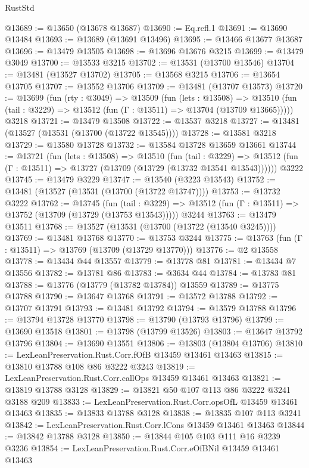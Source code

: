 \begin{lexlean}{RustStd}
\begin{coremodule}
@13689 := @13650 (@13678 @13687)
@13690 := Eq.refl.{1}
@13691 := @13690 @13484
@13693 := @13689 (@13691 @13496)
@13695 := @13466 @13677 @13687
@13696 := @13479 @13505
@13698 := @13696 @13676 @3215
@13699 := @13479 @3049
@13700 := @13533 @3215
@13702 := @13531 (@13700 @13546)
@13704 := @13481 (@13527 @13702)
@13705 := @13568 @3215
@13706 := @13654 @13705
@13707 := @13552 @13706
@13709 := @13481 (@13707 @13573)
@13720 := @13699
    (fun (rty : @3049) =>
    @13509
      (fun (lets : @13508) =>
      @13510 (fun (tail : @3229) => @13512 (fun (Γ : @13511) => @13704 (@13709 @13665)))))
    @3218
@13721 := @13479 @13508
@13722 := @13537 @3218
@13727 := @13481 (@13527 (@13531 (@13700 (@13722 @13545))))
@13728 := @13581 @3218
@13729 := @13580 @13728
@13732 := @13584 @13728 @13659 @13661
@13744 := @13721
    (fun (lets : @13508) =>
    @13510
      (fun (tail : @3229) =>
      @13512 (fun (Γ : @13511) => @13727 (@13709 (@13729 (@13732 @13541 @13543))))))
    @3222
@13745 := @13479 @3229
@13747 := @13540 (@3223 @13543)
@13752 := @13481 (@13527 (@13531 (@13700 (@13722 @13747))))
@13753 := @13732 @3222
@13762 := @13745
    (fun (tail : @3229) => @13512 (fun (Γ : @13511) => @13752 (@13709 (@13729 (@13753 @13543)))))
    @3244
@13763 := @13479 @13511
@13768 := @13527 (@13531 (@13700 (@13722 (@13540 @3245))))
@13769 := @13481 @13768
@13770 := @13753 @3244
@13775 := @13763 (fun (Γ : @13511) => @13769 (@13709 (@13729 @13770)))
@13776 := @2 @13558
@13778 := @13434 @44 @13557
@13779 := @13778 @81
@13781 := @13434 @7 @13556
@13782 := @13781 @86
@13783 := @3634 @44
@13784 := @13783 @81
@13788 := @13776 (@13779 (@13782 @13784)) @13559
@13789 := @13775 @13788
@13790 := @13647 @13768
@13791 := @13572 @13788
@13792 := @13707 @13791
@13793 := @13481 @13792
@13794 := @13579 @13788
@13796 := @13794 @13728 @13770
@13798 := @13790 (@13793 @13796)
@13799 := @13690 @13518
@13801 := @13798 (@13799 @13526)
@13803 := @13647 @13792 @13796
@13804 := @13690 @13551
@13806 := @13803 (@13804 @13706)
@13810 := LexLeanPreservation.Rust.Corr.fOfB @13459 @13461 @13463
@13815 := @13810 @13788 @108 @86 @3222 @3243
@13819 := LexLeanPreservation.Rust.Corr.callOps @13459 @13461 @13463
@13821 := @13819 @13788 @3128
@13829 := @13821 @50 @107 @113 @86 @3222 @3241 @3188 @209
@13833 := LexLeanPreservation.Rust.Corr.opsOfL @13459 @13461 @13463
@13835 := @13833 @13788 @3128
@13838 := @13835 @107 @113 @3241
@13842 := LexLeanPreservation.Rust.Corr.lCons @13459 @13461 @13463
@13844 := @13842 @13788 @3128
@13850 := @13844 @105 @103 @111 @16 @3239 @3236
@13854 := LexLeanPreservation.Rust.Corr.eOfBNil @13459 @13461 @13463

\end{coremodule}
\end{lexlean}
